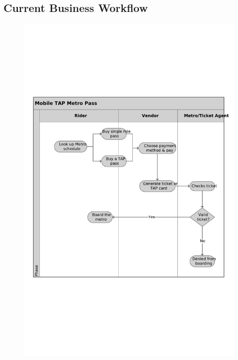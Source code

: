 \subsection{Current Business Workflow}
\begin{figure}[h]
\centering
\includegraphics[scale=.355]{CIR/uml.pdf}
\end{figure}